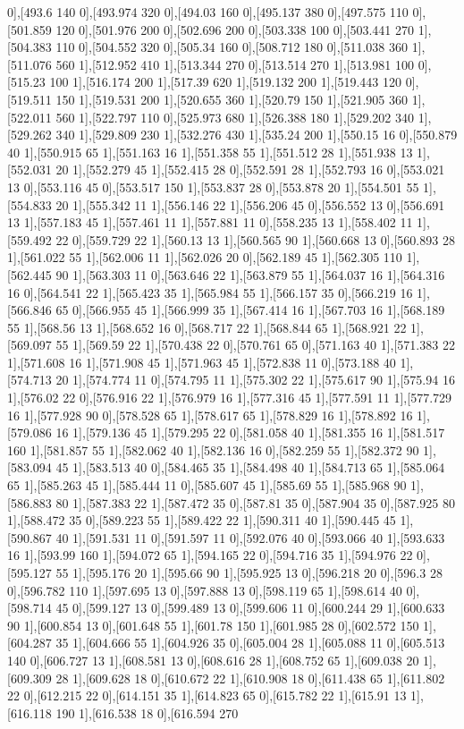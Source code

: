 {0],[493.6 140 0],[493.974 320 0],[494.03 160 0],[495.137 380 0],[497.575 110 0],[501.859 120 0],[501.976 200 0],[502.696 200 0],[503.338 100 0],[503.441 270 1],[504.383 110 0],[504.552 320 0],[505.34 160 0],[508.712 180 0],[511.038 360 1],[511.076 560 1],[512.952 410 1],[513.344 270 0],[513.514 270 1],[513.981 100 0],[515.23 100 1],[516.174 200 1],[517.39 620 1],[519.132 200 1],[519.443 120 0],[519.511 150 1],[519.531 200 1],[520.655 360 1],[520.79 150 1],[521.905 360 1],[522.011 560 1],[522.797 110 0],[525.973 680 1],[526.388 180 1],[529.202 340 1],[529.262 340 1],[529.809 230 1],[532.276 430 1],[535.24 200 1],[550.15 16 0],[550.879 40 1],[550.915 65 1],[551.163 16 1],[551.358 55 1],[551.512 28 1],[551.938 13 1],[552.031 20 1],[552.279 45 1],[552.415 28 0],[552.591 28 1],[552.793 16 0],[553.021 13 0],[553.116 45 0],[553.517 150 1],[553.837 28 0],[553.878 20 1],[554.501 55 1],[554.833 20 1],[555.342 11 1],[556.146 22 1],[556.206 45 0],[556.552 13 0],[556.691 13 1],[557.183 45 1],[557.461 11 1],[557.881 11 0],[558.235 13 1],[558.402 11 1],[559.492 22 0],[559.729 22 1],[560.13 13 1],[560.565 90 1],[560.668 13 0],[560.893 28 1],[561.022 55 1],[562.006 11 1],[562.026 20 0],[562.189 45 1],[562.305 110 1],[562.445 90 1],[563.303 11 0],[563.646 22 1],[563.879 55 1],[564.037 16 1],[564.316 16 0],[564.541 22 1],[565.423 35 1],[565.984 55 1],[566.157 35 0],[566.219 16 1],[566.846 65 0],[566.955 45 1],[566.999 35 1],[567.414 16 1],[567.703 16 1],[568.189 55 1],[568.56 13 1],[568.652 16 0],[568.717 22 1],[568.844 65 1],[568.921 22 1],[569.097 55 1],[569.59 22 1],[570.438 22 0],[570.761 65 0],[571.163 40 1],[571.383 22 1],[571.608 16 1],[571.908 45 1],[571.963 45 1],[572.838 11 0],[573.188 40 1],[574.713 20 1],[574.774 11 0],[574.795 11 1],[575.302 22 1],[575.617 90 1],[575.94 16 1],[576.02 22 0],[576.916 22 1],[576.979 16 1],[577.316 45 1],[577.591 11 1],[577.729 16 1],[577.928 90 0],[578.528 65 1],[578.617 65 1],[578.829 16 1],[578.892 16 1],[579.086 16 1],[579.136 45 1],[579.295 22 0],[581.058 40 1],[581.355 16 1],[581.517 160 1],[581.857 55 1],[582.062 40 1],[582.136 16 0],[582.259 55 1],[582.372 90 1],[583.094 45 1],[583.513 40 0],[584.465 35 1],[584.498 40 1],[584.713 65 1],[585.064 65 1],[585.263 45 1],[585.444 11 0],[585.607 45 1],[585.69 55 1],[585.968 90 1],[586.883 80 1],[587.383 22 1],[587.472 35 0],[587.81 35 0],[587.904 35 0],[587.925 80 1],[588.472 35 0],[589.223 55 1],[589.422 22 1],[590.311 40 1],[590.445 45 1],[590.867 40 1],[591.531 11 0],[591.597 11 0],[592.076 40 0],[593.066 40 1],[593.633 16 1],[593.99 160 1],[594.072 65 1],[594.165 22 0],[594.716 35 1],[594.976 22 0],[595.127 55 1],[595.176 20 1],[595.66 90 1],[595.925 13 0],[596.218 20 0],[596.3 28 0],[596.782 110 1],[597.695 13 0],[597.888 13 0],[598.119 65 1],[598.614 40 0],[598.714 45 0],[599.127 13 0],[599.489 13 0],[599.606 11 0],[600.244 29 1],[600.633 90 1],[600.854 13 0],[601.648 55 1],[601.78 150 1],[601.985 28 0],[602.572 150 1],[604.287 35 1],[604.666 55 1],[604.926 35 0],[605.004 28 1],[605.088 11 0],[605.513 140 0],[606.727 13 1],[608.581 13 0],[608.616 28 1],[608.752 65 1],[609.038 20 1],[609.309 28 1],[609.628 18 0],[610.672 22 1],[610.908 18 0],[611.438 65 1],[611.802 22 0],[612.215 22 0],[614.151 35 1],[614.823 65 0],[615.782 22 1],[615.91 13 1],[616.118 190 1],[616.538 18 0],[616.594 270 }
